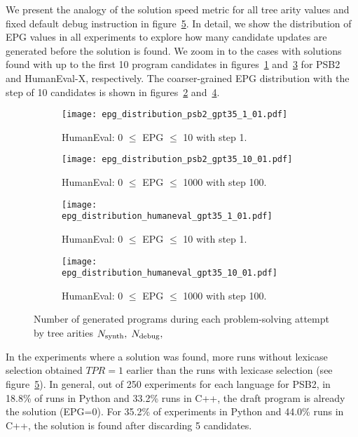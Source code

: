 We present the analogy of the solution speed metric for all tree arity values and fixed default debug instruction in figure~\ref{fig:epg-distribution}. 
In detail, we show the distribution of EPG values in all experiments to explore how many candidate updates are generated before the solution is found.
We zoom in to the cases with solutions found with up to the first 10 program candidates in figures~\ref{fig:psb2-epg-distrib-step-1} and~\ref{fig:humaneval-epg-distrib-step-1} for PSB2 and HumanEval-X, respectively. 
The coarser-grained EPG distribution with the step of 10 candidates is shown in figures~\ref{fig:psb2-epg-distrib-step-10} and~\ref{fig:humaneval-epg-distrib-step-10}. 

\begin{figure}
\begin{subfigure}{\columnwidth}
\centering
\texttt{[image: epg\_distribution\_psb2\_gpt35\_1\_01.pdf]}
  \caption{HumanEval: 0 $\leq$ EPG $\leq$ 10 with step 1.}
  \label{fig:psb2-epg-distrib-step-1}
\end{subfigure}
% 
% 
\begin{subfigure}{\columnwidth}
\centering
\texttt{[image: epg\_distribution\_psb2\_gpt35\_10\_01.pdf]}
  \caption{HumanEval: 0 $\leq$ EPG $\leq$ 1000 with step 100.}
  \label{fig:psb2-epg-distrib-step-10}
\end{subfigure}
% 
\begin{subfigure}{\columnwidth}
\centering
\texttt{[image: epg\_distribution\_humaneval\_gpt35\_1\_01.pdf]}
  \caption{HumanEval: 0 $\leq$ EPG $\leq$ 10 with step 1.}
  \label{fig:humaneval-epg-distrib-step-1}
\end{subfigure}
% 
\begin{subfigure}{\columnwidth}
\centering
\texttt{[image: epg\_distribution\_humaneval\_gpt35\_10\_01.pdf]}
  \caption{HumanEval: 0 $\leq$ EPG $\leq$ 1000 with step 100.}
  \label{fig:humaneval-epg-distrib-step-10}
\end{subfigure}
\caption{Number of generated programs during each problem-solving attempt by tree arities $N_\text{synth}{}, \; N_\text{debug}{},$ }
\label{fig:epg-distribution}
\end{figure}

In the experiments where a solution was found, more runs without lexicase selection obtained $TPR=1$ earlier than the runs with lexicase selection (see figure~\ref{fig:epg-distribution}).
In general, out of 250 experiments for each language for PSB2, in 18.8\% of runs in Python and 33.2\% runs in C++, the draft program is already the solution (EPG=0). 
For 35.2\% of experiments in Python and 44.0\% runs in C++, the solution is found after discarding 5 candidates. 

